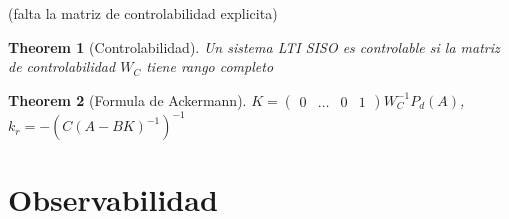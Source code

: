 \documentclass[leqno]{article}
\newtheorem*{theorem}{Theorem}
\begin{document}
(falta la matriz de controlabilidad explicita)

\begin{theorem}[Controlabilidad] Un sistema LTI SISO es controlable si la matriz de controlabilidad $W_C$ tiene rango completo
\end{theorem}

\begin{theorem}[Formula de Ackermann]
  $K = \begin{pmatrix}  0 & \ldots & 0 & 1 \end{pmatrix} W_C^{-1}P_d(A) $, $k_r = -(C(A-BK)^{-1})^{-1}$
\end{theorem}

\section{Observabilidad}
\end{document}
